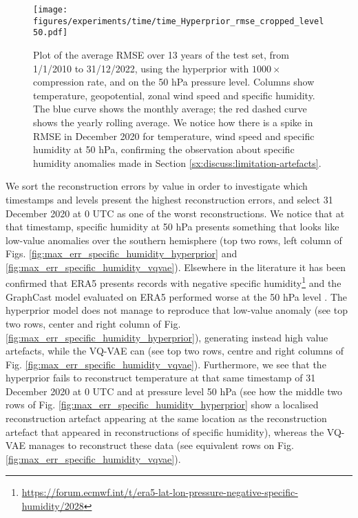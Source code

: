 \begin{figure}
    \centering
    \texttt{[image: figures/experiments/time/time\_Hyperprior\_rmse\_cropped\_level50.pdf]}
    \hfill
    \caption{Plot of the average RMSE over 13 years of the test set, from 1/1/2010 to 31/12/2022, using the hyperprior with $1000\times$ compression rate, and on the 50 hPa pressure level. Columns show temperature, geopotential, zonal wind speed and specific humidity. The blue curve shows the monthly average; the red dashed curve shows the yearly rolling average. We notice how there is a spike in RMSE in December 2020 for temperature, wind speed and specific humidity at 50 hPa, confirming the observation about specific humidity anomalies made in Section \ref{sx:discuss:limitation-artefacts}.}
    \label{fig:generalisation-time-50hPa}
\end{figure}


We sort the reconstruction errors by value in order to investigate which timestamps and levels present the highest reconstruction errors, and select 31 December 2020 at 0 UTC as one of the worst reconstructions. We notice that at that timestamp, specific humidity at 50 hPa presents something that looks like low-value anomalies over the southern hemisphere (top two rows, left column of Figs. \ref{fig:max_err_specific_humidity_hyperprior} and \ref{fig:max_err_specific_humidity_vqvae}). Elsewhere in the literature it has been confirmed that ERA5 presents records with negative specific humidity\footnote{\url{https://forum.ecmwf.int/t/era5-lat-lon-pressure-negative-specific-humidity/2028}} and the GraphCast model evaluated on ERA5 performed worse at the 50 hPa level \citep{lam2023graphcast}. The hyperprior model does not manage to reproduce that low-value anomaly (see top two rows, center and right column of Fig. \ref{fig:max_err_specific_humidity_hyperprior}), generating instead high value artefacts, while the VQ-VAE can (see top two rows, centre and right columns of Fig. \ref{fig:max_err_specific_humidity_vqvae}). Furthermore, we see that the hyperprior fails to reconstruct temperature at that same timestamp of 31 December 2020 at 0 UTC and at pressure level 50 hPa (see how the middle two rows of Fig. \ref{fig:max_err_specific_humidity_hyperprior} show a localised reconstruction artefact appearing at the same location as the reconstruction artefact that appeared in reconstructions of specific humidity), whereas the VQ-VAE manages to reconstruct these data (see equivalent rows on Fig. \ref{fig:max_err_specific_humidity_vqvae}). 

